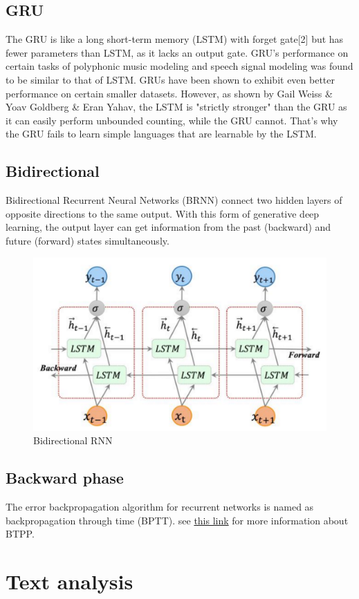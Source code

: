 \documentclass[10pt]{SelfArx} %
\begin{document}
	\subsection{GRU}
	The GRU is like a long short-term memory (LSTM) with forget gate[2] but has fewer parameters than LSTM, as it lacks an output gate. GRU's performance on certain tasks of polyphonic music modeling and speech signal modeling was found to be similar to that of LSTM. GRUs have been shown to exhibit even better performance on certain smaller datasets. However, as shown by Gail Weiss \& Yoav Goldberg \& Eran Yahav, the LSTM is "strictly stronger" than the GRU as it can easily perform unbounded counting, while the GRU cannot. That's why the GRU fails to learn simple languages that are learnable by the LSTM. 
	\subsection{Bidirectional}
	Bidirectional Recurrent Neural Networks (BRNN) connect two hidden layers of opposite directions to the same output. With this form of generative deep learning, the output layer can get information from the past (backward) and future (forward) states simultaneously.
\begin{figure}\centering 
	\includegraphics[width=.85\linewidth]{img/bidirectional}
	\caption{Bidirectional RNN}
\end{figure}
	\subsection{Backward phase}
	The error backpropagation algorithm for recurrent networks is named as backpropagation through time (BPTT). see  \href{https://machinelearningmastery.com/gentle-introduction-backpropagation-time/}{this link} for more information about BTPP.
	\section{Text analysis}
\end{document}
